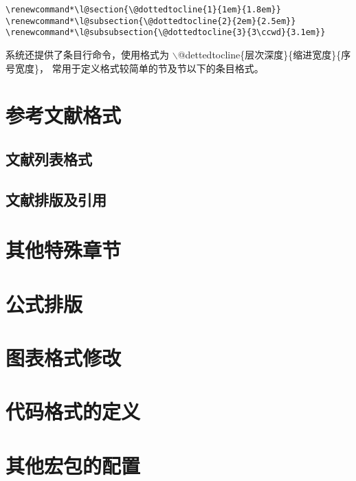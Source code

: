 \begin{lstlisting}[style=latex]
% 子标题的格式设置
\renewcommand*\l@section{\@dottedtocline{1}{1em}{1.8em}}
\renewcommand*\l@subsection{\@dottedtocline{2}{2em}{2.5em}}
\renewcommand*\l@subsubsection{\@dottedtocline{3}{3\ccwd}{3.1em}}
\end{lstlisting}
系统还提供了条目行命令，使用格式为
$\backslash$@dettedtocline\{层次深度\}\{缩进宽度\}\{序号宽度\}，
常用于定义格式较简单的节及节以下的条目格式。


\section{参考文献格式}
\subsection{文献列表格式}

\subsection{文献排版及引用}


\section{其他特殊章节}


\section{公式排版}


\section{图表格式修改}


\section{代码格式的定义}


\section{其他宏包的配置}


